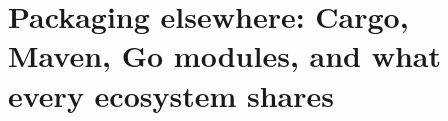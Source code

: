 \chapter{Packaging elsewhere: Cargo, Maven, Go modules, and what every ecosystem shares}
\label{ch:packaging-elsewhere-cargo-maven-go}

